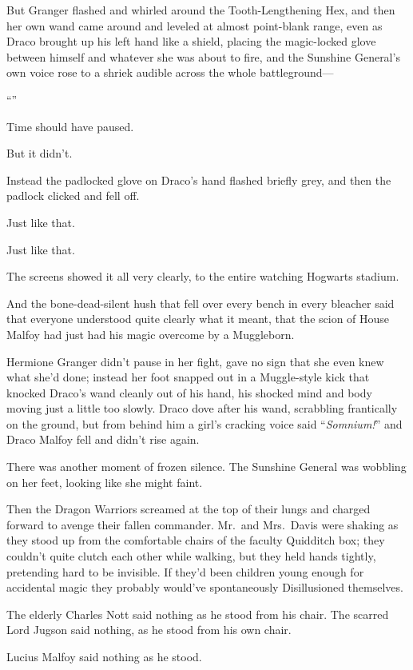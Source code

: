 But Granger flashed and whirled around the Tooth-Lengthening
Hex, and then her own wand came around and leveled at almost
point-blank range, even as Draco brought up his left hand like a
shield, placing the magic-locked glove between himself and whatever
she was about to fire, and the Sunshine General’s own voice rose to
a shriek audible across the whole battleground—

“”

Time should have paused.

But it didn’t.

Instead the padlocked glove on Draco’s hand flashed briefly
grey, and then the padlock clicked and fell off.

Just like that.

Just like that.

The screens showed it all very clearly, to the entire watching
Hogwarts stadium.

And the bone-dead-silent hush that fell over every bench in
every bleacher said that everyone understood quite clearly what it
meant, that the scion of House Malfoy had just had his magic
overcome by a Muggleborn.

Hermione Granger didn’t pause in her fight, gave no sign that
she even knew what she’d done; instead her foot snapped out in a
Muggle-style kick that knocked Draco’s wand cleanly out of his
hand, his shocked mind and body moving just a little too slowly.
Draco dove after his wand, scrabbling frantically on the ground,
but from behind him a girl’s cracking voice said “\emph{Somnium!}”
and Draco Malfoy fell and didn’t rise again.

There was another moment of frozen silence. The Sunshine General
was wobbling on her feet, looking like she might faint.

Then the Dragon Warriors screamed at the top of their lungs and
charged forward to avenge their fallen commander.
\sbreak
Mr.~and Mrs.~Davis were shaking as they stood up from the
comfortable chairs of the faculty Quidditch box; they couldn’t
quite clutch each other while walking, but they held hands tightly,
pretending hard to be invisible. If they’d been children young
enough for accidental magic they probably would’ve spontaneously
Disillusioned themselves.

The elderly Charles Nott said nothing as he stood from his
chair. The scarred Lord Jugson said nothing, as he stood from his
own chair.

Lucius Malfoy said nothing as he stood.

